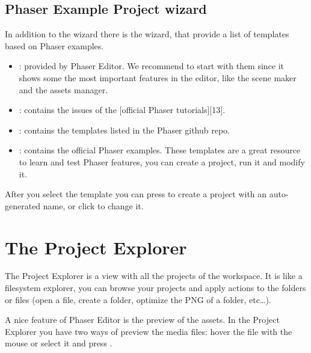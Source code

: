 \documentclass[letterpaper,10pt,english]{sphinxmanual}
\begin{document}


\subsection{Phaser Example Project wizard}
\label{\detokenize{first_steps:phaser-example-project-wizard}}
In addition to the  wizard there is the   wizard, that provide a list of templates based on Phaser examples.

\noindent{}
\begin{itemize}
\item {} 
: provided by Phaser Editor. We recommend to start with them since it shows some the most important features in the editor, like the scene maker and the assets manager.

\item {} 
: contains the issues of the {[}official Phaser tutorials{]}{[}13{]}.

\item {} 
: contains the templates listed in the Phaser github repo.

\item {} 
: contains the official Phaser examples. These templates are a great resource to learn and test Phaser features, you can create a project, run it and modify it.

\end{itemize}

After you select the template you can press  to create a project with an auto-generated name, or click  to change it.


\section{The Project Explorer}
\label{\detokenize{first_steps:the-project-explorer}}
The Project Explorer is a view with all the projects of the workspace. It is like a filesystem explorer, you can browse your projects and apply actions to the folders or files (open a file, create a folder, optimize the PNG of a folder, etc…).

A nice feature of Phaser Editor is the preview of the assets. In the Project Explorer you have two ways of preview the media files: hover the file with the mouse or select it and press .
\end{document}
